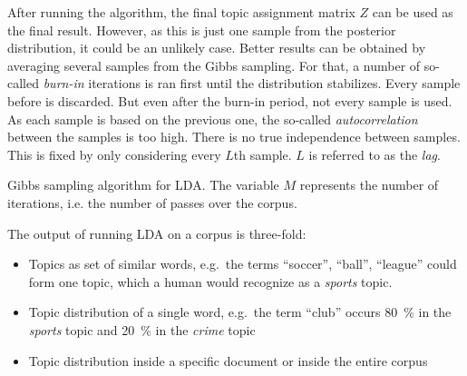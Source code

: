\documentclass[
        a4paper,
        titlepage,
        twoside,
        parskip,
        numbers=noenddot
        ]{scrbook}
\theoremstyle{break}
\begin{document}
After running the algorithm, the final topic assignment matrix $Z$ can be used as the final result.
However, as this is just one sample from the posterior distribution, it could be an unlikely case.
Better results can be obtained by averaging several samples from the Gibbs sampling.
For that, a number of so-called \emph{burn-in} iterations is ran first until the distribution stabilizes.
Every sample before is discarded.
But even after the burn-in period, not every sample is used.
As each sample is based on the previous one, the so-called \emph{autocorrelation} between the samples is too high.
There is no true independence between samples.
This is fixed by only considering every $L$th sample.
$L$ is referred to as the \emph{lag}.

\begin{algorithm}
  \caption{Gibbs sampling algorithm for LDA. The variable $M$ represents the number of iterations, i.e. the number of passes over the corpus.}
  \label{alg:gibbs_sampling}
  \begin{algorithmic}[1]
        \EndFor
      \EndFor
    \EndFor
    \EndProcedure
  \end{algorithmic}
\end{algorithm}
\label{sec:lda}

The output of running LDA on a corpus is three-fold:
\begin{itemize}
  \item Topics as set of similar words, e.g.\ the terms ``soccer'', ``ball'', ``league'' could form one topic, which a human would recognize as a \emph{sports} topic.
  \item Topic distribution of a single word, e.g.\ the term ``club'' occurs 80~\% in the \emph{sports} topic and 20~\% in the \emph{crime} topic
  \item Topic distribution inside a specific document or inside the entire corpus
\end{itemize}
\end{document}
